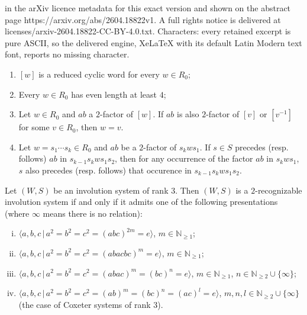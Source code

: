 \documentclass[10pt,a4paper]{amsart}
\newcommand{\N}{\mathbb{N}}
\newcommand{\id}{\textit{e}}
\begin{document}
in the arXiv licence metadata for this exact version and shown on the abstract page https://arxiv.org/abs/2604.18822v1. A full rights notice is delivered at licenses/arxiv-2604.18822-CC-BY-4.0.txt. Characters: every retained excerpt is pure ASCII, so the delivered engine, XeLaTeX with its default Latin Modern text font, reports no missing character.
\begin{enumerate}[series=2-recognizable]    
    \item \label{condition 1 - recognizable} $[w]$ is a reduced cyclic word for every $w \in R_0$;

    \item \label{condition 2 - recognizable} Every $w \in R_0$ has even length at least $4$;

	\item
	\label{condition 3 - recognizable}
	Let $w\in R_0$ and $ab$ a $2$-factor of $[w]$. If $ab$ is also $2$-factor of $[v]$ or $[v^{-1}]$ for some $v\in R_0$, then $w=v$.
   
    \item \label{condition 4 - recognizable} Let $w=s_1\cdots s_k\in R_0$ and $ab$ be a $2$-factor of $s_kws_1$. If $s\in S$ precedes (resp. follows) $ab$ in $s_{k-1} s_kws_1 s_2$, then for any occurrence of the factor $ab$ in $s_kws_1$,  $s$  also precedes (resp. follows) that occurence in $s_{k-1} s_kws_1 s_2$.
\end{enumerate}

\begin{thm}
\label{thm:rk3-reco}
    Let $(W,S)$ be an involution system of rank 3. Then $(W,S)$ is a $2$-recognizable involution system if and only if it admits one of the following presentations (where $\infty$ means there is no relation): 
    \begin{enumerate}[(i)]
        \item $\langle a,b,c \, | \, a^2=b^2=c^2 = (abc)^{2m}=\id\rangle$, $m \in \N_{\geq 1}$; \label{type1}
        
        \item $\langle a,b,c \, | \, a^2=b^2=c^2 = (abacbc)^{m}=\id \rangle$, $m \in \N_{\geq 1}$; \label{type2}
        
        \item $\langle a,b,c \, | \, a^2=b^2=c^2 = (abac)^m=(bc)^n=\id\rangle$, $m \in \N_{\geq 1}$, $n \in \N_{\geq 2} \cup \{\infty\}$; \label{type3}

        \item $\langle a,b,c \, | \, a^2=b^2=c^2 = (ab)^m=(bc)^n=(ac)^l=\id\rangle$, $m,n,l \in \N_{\geq 2} \cup \{\infty\}$ (the case of Coxeter systems of rank $3$). \label{type4}
    
    \end{enumerate}    
\end{thm}
\end{document}
